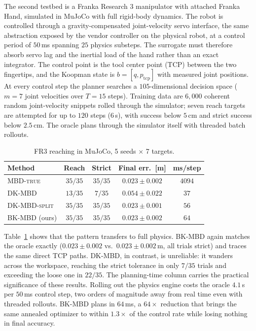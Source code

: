 \documentclass[lettersize,journal]{IEEEtran}
\theoremstyle{remark}
\newcommand{\mbdtrue}{\textsc{MBD-true}}
\newcommand{\dkmbd}{\textsc{DK-MBD}}
\newcommand{\dksplit}{\textsc{DK-MBD-split}}
\newcommand{\bkmbd}{\textsc{BK-MBD}}
\begin{document}
The second testbed is a Franka
Research 3 manipulator with attached Franka Hand, simulated in MuJoCo with
full rigid-body dynamics. The robot is controlled through a
gravity-compensated joint-velocity servo interface, the same
abstraction exposed by the vendor controller on the physical robot, at
a control period of $50$\,ms spanning $25$ physics substeps. The
surrogate must therefore absorb servo lag and the inertial load of the
hand rather than an exact integrator. The control point is the tool center point (TCP) between the
two fingertips, and the Koopman state is $b = [q, p_{\mathrm{tcp}}]$
with measured joint positions. At every control step the planner
searches a $105$-dimensional decision space ($m = 7$ joint velocities
over $T = 15$ steps). Training data are $6{,}000$ coherent random
joint-velocity snippets rolled through the simulator; seven reach targets
are attempted for up to $120$ steps ($6$\,s), with success below $5$\,cm
and strict success below $2.5$\,cm. The oracle plans through the simulator
itself with threaded batch rollouts.

\begin{table}[t]
\centering
\caption{FR3 reaching in MuJoCo, 5 seeds $\times$ 7 targets.}
\label{tab:franka}
\begin{tabular}{lcccc}
\hline
Method & Reach & Strict & Final err.\ [m] & ms/step \\
\hline
\mbdtrue{} & $35/35$ & $35/35$ & $0.023 \pm 0.002$ & $4094$ \\
\dkmbd{} & $13/35$ & $7/35$ & $0.054 \pm 0.022$ & $37$ \\
\dksplit{} & $35/35$ & $35/35$ & $0.023 \pm 0.001$ & $56$ \\
\bkmbd{} (ours) & $35/35$ & $35/35$ & $0.023 \pm 0.002$ & $64$ \\
\hline
\end{tabular}
\end{table}

Table~\ref{tab:franka} shows that the
pattern transfers to full physics. \bkmbd{} again matches the oracle
exactly ($0.023 \pm 0.002$ vs.\ $0.023 \pm 0.002$\,m, all trials
strict) and traces the same direct TCP paths. \dkmbd{}, in contrast, is
unreliable: it wanders across the workspace, reaching the strict
tolerance in only $7/35$
trials and exceeding the loose one in $22/35$. The planning-time column
carries the practical significance of these results. Rolling out the
physics engine costs the oracle $4.1$\,s per $50$\,ms control step, two
orders of magnitude away from real time even with threaded rollouts.
\bkmbd{} plans in $64$\,ms, a $64\times$ reduction that brings the same
annealed optimizer to within $1.3\times$ of the control rate while
losing nothing in final accuracy.
\end{document}
